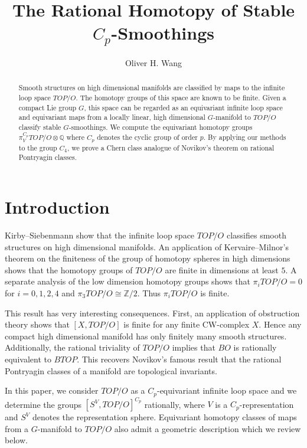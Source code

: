 \documentclass[11pt, twoside]{amsart}
\theoremstyle{plain}
\theoremstyle{definition}
\theoremstyle{remark}
\newcommand{\Q}{\mathbb Q}
\newcommand{\Z}{\mathbb Z}
\begin{document}
    \title{The Rational Homotopy of Stable $C_p$-Smoothings}
    \author{Oliver H. Wang}
    \address{Department of Mathematics, The University of Virginia, Charlottesville, VA 22904, USA}
	\maketitle

\begin{abstract}
Smooth structures on high dimensional manifolds are classified by maps to the infinite loop space $TOP/O$.
The homotopy groups of this space are known to be finite.
Given a compact Lie group $G$, this space can be regarded as an equivariant infinite loop space and equivariant maps from a locally linear, high dimensional $G$-manifold to $TOP/O$ classify stable $G$-smoothings.
We compute the equivariant homotopy groups $\pi_V^{C_p}TOP/O\otimes\Q$ where $C_p$ denotes the cyclic group of order $p$.
By applying our methods to the group $C_4$, we prove a Chern class analogue of Novikov's theorem on rational Pontryagin classes.
\end{abstract}


\section{Introduction}
Kirby--Siebenmann \cite{KirbySiebenmann} show that the infinite loop space $TOP/ O$ classifies smooth structures on high dimensional manifolds.
An application of Kervaire--Milnor's theorem on the finiteness of the group of homotopy spheres in high dimensions \cite{KervaireMilnor} shows that the homotopy groups of $TOP/ O$ are finite in dimensions at least $5$.
A separate analysis of the low dimension homotopy groups shows that $\pi_iTOP/ O=0$ for $i=0,1,2,4$ and $\pi_3 TOP/ O\cong\Z/2$.
Thus $\pi_i TOP/ O$ is finite.

This result has very interesting consequences.
First, an application of obstruction theory shows that $[X, TOP/ O]$ is finite for any finite CW-complex $X$.
Hence any compact high dimensional manifold has only finitely many smooth structures.
Additionally, the rational triviality of $TOP/O$ implies that $BO$ is rationally equivalent to $BTOP$.
This recovers Novikov's famous result that the rational Pontryagin classes of a manifold are topological invariants.

In this paper, we consider $ TOP/O$ as a $C_p$-equivariant infinite loop space and we determine the groups $[S^V, TOP/ O]^{C_p}$ rationally, where $V$ is a $C_p$-representation and $S^V$ denotes the representation sphere.
Equivariant homotopy classes of maps from a $G$-manifold to $ TOP/O$ also admit a geometric description which we review below.
\end{document}
